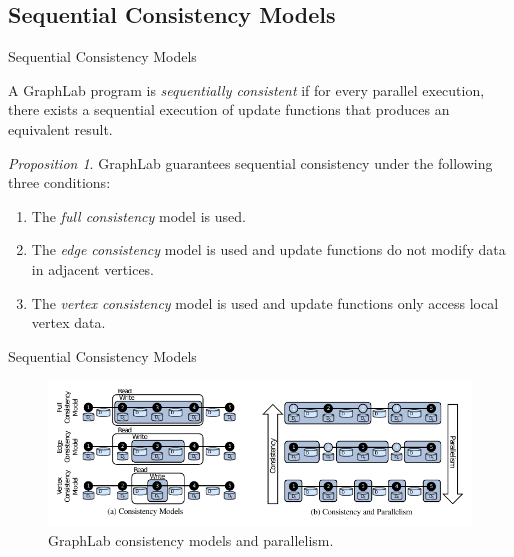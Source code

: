 \documentclass[onlymath,xcolor=pdftex,dvipsnames,table]{beamer}
\let\oldemph\emph
\renewcommand{\emph}[1]{{\color{Blue}\oldemph{#1}}}
\theoremstyle{remark} %
\newtheorem{proposition}{Proposition}
\begin{document}
\subsection{Sequential Consistency Models}
\begin{frame}{Sequential Consistency Models}
\begin{definition}
A GraphLab program is \emph{sequentially consistent} if for every parallel execution, there exists a sequential execution of update functions that produces an equivalent result.
\end{definition}
\begin{proposition}
GraphLab guarantees sequential consistency under the following three conditions:
\begin{enumerate}
  \item The \emph{full consistency} model is used.
  \item The \emph{edge consistency} model is used and update functions do not modify data in adjacent vertices.
  \item The \emph{vertex consistency} model is used and update functions only access local vertex data.
\end{enumerate}
\end{proposition}
\end{frame}

\begin{frame}{Sequential Consistency Models}
\begin{figure}
  \centering
  \includegraphics[clip,trim=0 8 0 0,width=\textwidth]{consistency.pdf}
  \caption{GraphLab consistency models and parallelism.}
\end{figure}
\end{frame}

\end{document}
